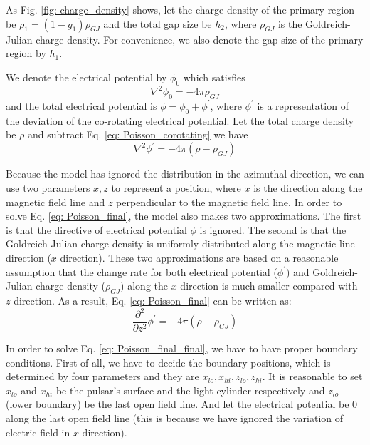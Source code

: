 \documentclass[12pt]{report}
\newcommand{\gj}[0]{
  Goldreich-Julian charge density
}
\newcommand{\myComment}[1]{
  \newline
}
\begin{document}
        As Fig. \ref{fig: charge_density} shows, 
        let the charge density of the primary region be $\rho_1 = (1-g_{1}) \rho_{GJ}$ and 
        the total gap size be
        $h_{2}$, where $\rho_{GJ}$ is the Goldreich-Julian charge density. For convenience, 
        we also denote the gap size of the primary region by $h_{1}$. 
        \myComment{Then we can calculate electric potential and electric field by solving the Poisson equation }

        We denote the electrical potential by $\phi_{0}$ which satisfies 
        \begin{equation}
          \label{eq: Poisson_corotating}
          \nabla^{2}\phi_{0} = -4\pi\rho_{GJ}
        \end{equation}
        and the total electrical potential is $\phi = \phi_{0} + \phi^{\prime}$, where $\phi^{\prime}$ is a 
        representation of the deviation of the co-rotating electrical potential.  
        Let the total charge density be $\rho$ and subtract Eq. \ref{eq: Poisson_corotating} we have 
        \begin{equation}
          \label{eq: Poisson_final}
          \nabla^{2}\phi^{\prime} = -4\pi\left(\rho - \rho_{GJ} \right)
        \end{equation}

      Because the model has ignored the distribution in the azimuthal direction, we can use two parameters 
      $x, z$ to represent a position, where $x$ is the direction along the magnetic field line and $z$  
      perpendicular to the magnetic field line. In order to solve Eq. \ref{eq: Poisson_final}, 
      the model also makes two approximations. The first is that the directive of electrical potential $\phi$ 
      is ignored. The second is that the \gj{} is uniformly distributed along the magnetic line direction 
      ($x$ direction). These two approximations are based on a reasonable assumption that the change rate 
      for both electrical potential ($\phi^{\prime}$) and \gj{}($\rho_{GJ}$) along the $x$ direction is much 
      smaller compared with $z$ direction. 
      As a result, Eq. \ref{eq: Poisson_final} can be written as: 
      \begin{equation}
        \label{eq: Poisson_final_final}
        \frac{\partial^2}{\partial z^2} \phi^{\prime} = -4\pi\left(\rho - \rho_{GJ} \right)
      \end{equation}

      In order to solve Eq. \ref{eq: Poisson_final_final}, we have to have proper boundary conditions. 
      First of all, we have to decide the boundary positions, which is determined by four parameters and they are  
      $x_{lo}, x_{hi}, z_{lo}, z_{hi}$. It is reasonable to set $x_{lo}$ and $x_{hi}$
      be the pulsar's surface and the light cylinder respectively and $z_{lo}$ (lower boundary) be the last open 
      field line. And let the electrical potential be $0$ along the last open field line (this is because we have 
      ignored the variation of electric field in $x$ direction).   
\end{document}
